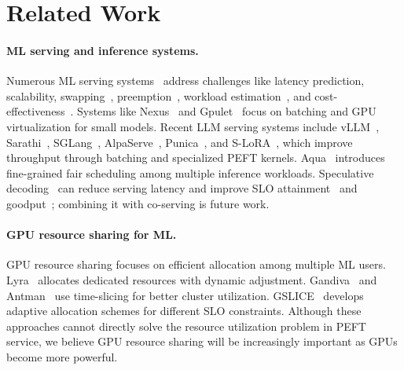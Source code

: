 \section{Related Work}
\label{flexllm:sec:related}

\paragraph{ML serving and inference systems.} Numerous ML serving systems~\cite{258862,gunasekaran2022cocktail,lee2018pretzel,romero2021infaas,crankshaw2017clipper} address challenges like latency prediction, scalability, swapping~\cite{bai2020pipeswitch}, preemption~\cite{choi2020prema}, workload estimation~\cite{285173}, and cost-effectiveness~\cite{zhang2019mark}. Systems like Nexus~\cite{shen2019nexus} and Gpulet~\cite{choi2022serving} focus on batching and GPU virtualization for small models.
Recent LLM serving systems include vLLM~\cite{vllm}, Sarathi~\cite{agrawal2023sarathi}, SGLang~\cite{sglang}, AlpaServe~\cite{li2023alpaserve}, Punica~\cite{chen2023punica}, and S-LoRA~\cite{sheng2023s}, which improve throughput through batching and specialized PEFT kernels. Aqua~\cite{aqua2024} introduces fine-grained fair scheduling among multiple inference workloads.
Speculative decoding~\cite{chen2023accelerating,specinfer,suffixdecoding} can reduce serving latency and improve SLO attainment~\cite{adaserve} and goodput~\cite{turbospec}; combining it with co-serving is future work.

\paragraph{GPU resource sharing for ML.} GPU resource sharing focuses on efficient allocation among multiple ML users. Lyra~\cite{li2023lyra} allocates dedicated resources with dynamic adjustment. Gandiva~\cite{xiao2018gandiva} and Antman~\cite{xiao2020antman} use time-slicing for better cluster utilization. GSLICE~\cite{dhakal2020gslice} develops adaptive allocation schemes for different SLO constraints. Although these approaches cannot directly solve the resource utilization problem in PEFT service, we believe GPU resource sharing will be increasingly important as GPUs become more powerful.

